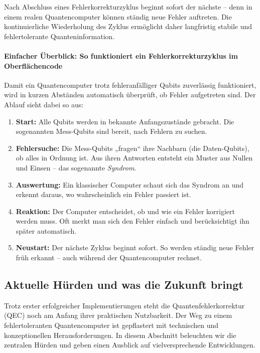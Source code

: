Nach Abschluss eines Fehlerkorrekturzyklus beginnt sofort der nächste – denn in einem realen Quantencomputer können ständig neue Fehler auftreten. Die kontinuierliche Wiederholung des Zyklus ermöglicht daher langfristig stabile und fehlertolerante Quanteninformation.\\

\paragraph{Einfacher Überblick: So funktioniert ein Fehlerkorrekturzyklus im Oberflächencode}Damit ein Quantencomputer trotz fehleranfälliger Qubits zuverlässig funktioniert, wird in kurzen Abständen automatisch überprüft, ob Fehler aufgetreten sind. Der Ablauf sieht dabei so aus:

\begin{enumerate}
  \item \textbf{Start:}  
  Alle Qubits werden in bekannte Anfangszustände gebracht. Die sogenannten Mess-Qubits sind bereit, nach Fehlern zu suchen.

  \item \textbf{Fehlersuche:}  
  Die Mess-Qubits „fragen“ ihre Nachbarn (die Daten-Qubits), ob alles in Ordnung ist. Aus ihren Antworten entsteht ein Muster aus Nullen und Einsen – das sogenannte \emph{Syndrom}.

  \item \textbf{Auswertung:}  
  Ein klassischer Computer schaut sich das Syndrom an und erkennt daraus, wo wahrscheinlich ein Fehler passiert ist.

  \item \textbf{Reaktion:}  
  Der Computer entscheidet, ob und wie ein Fehler korrigiert werden muss. Oft merkt man sich den Fehler einfach und berücksichtigt ihn später automatisch.

  \item \textbf{Neustart:}  
  Der nächste Zyklus beginnt sofort. So werden ständig neue Fehler früh erkannt – auch während der Quantencomputer rechnet.
\end{enumerate}

\subsection{Aktuelle H\"urden und was die Zukunft bringt}

Trotz erster erfolgreicher Implementierungen steht die Quantenfehlerkorrektur (QEC) noch am Anfang ihrer praktischen Nutzbarkeit. Der Weg zu einem fehlertoleranten Quantencomputer ist gepflastert mit technischen und konzeptionellen Herausforderungen. In diesem Abschnitt beleuchten wir die zentralen H\"urden und geben einen Ausblick auf vielversprechende Entwicklungen.\\

